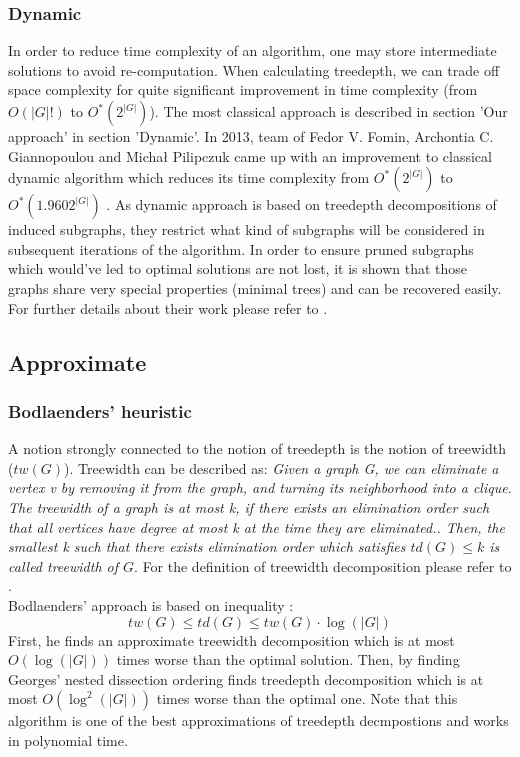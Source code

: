 \subsubsection{Dynamic}
In order to reduce time complexity of an algorithm, one may store intermediate solutions to avoid re-computation. When calculating treedepth, we can trade off space complexity for quite significant improvement in time complexity (from $O\left(\left|G\right|!\right)$ to $O^{*}\left(2^{\left|G\right|}\right)$). The most classical approach is described in section 'Our approach' in section 'Dynamic'. In 2013, team of Fedor V. Fomin, Archontia C. Giannopoulou and Michał Pilipczuk came up with an improvement to classical dynamic algorithm which reduces its time complexity from $O^{*}\left(2^{\left|G\right|}\right)$ to $O^{*}\left(1.9602^{\left|G\right|}\right)$ \cite{mimuw_td}. As dynamic approach is based on treedepth decompositions of induced subgraphs, they restrict what kind of subgraphs will be considered in subsequent iterations of the algorithm. In order to ensure pruned subgraphs which would've led to optimal solutions are not lost, it is shown that those graphs share very special properties (minimal trees) and can be recovered easily. For further details about their work please refer to \cite{mimuw_td}.
\newpage
\subsection{Approximate}
\subsubsection{Bodlaenders' heuristic \cite{bodlaender_td_approx}}
A notion strongly connected to the notion of treedepth is the notion of treewidth ($tw\left(G\right)$). Treewidth can be described as:
\emph{Given a graph G, we can eliminate a vertex v by removing it from the graph, and turning its neighborhood into a clique. The treewidth of a graph is at most k, if there exists an elimination order such that all vertices have degree at most k at the time they are eliminated.\cite{tw_gpu}. Then, the smallest k such that there exists elimination order which satisfies $td(G)\leq k$ is called treewidth of $G$}. For the definition of treewidth decomposition please refer to \cite{tw_decomp}.\\
Bodlaenders' approach is based on inequality \cite{mimuw_td}\cite{bodlaender_td_approx}:
\begin{equation}
tw(G) \leq td(G) \leq tw(G)\cdot \log\left(\left|G\right|\right)
\end{equation}
First, he finds an approximate treewidth decomposition which is at most $O\left(\log\left(\left|G\right|\right)\right)$ times worse than the optimal solution.
Then, by finding Georges' nested dissection ordering \cite{george}\cite{bodlaender_td_approx} finds treedepth decomposition which is at most $O\left(\log^2\left(\left|G\right|\right)\right)$ times worse than the optimal one. Note that this algorithm is one of the best approximations of treedepth decmpostions and works in polynomial time.
